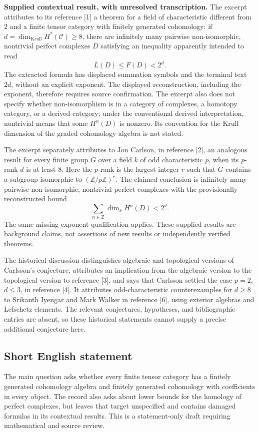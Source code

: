 \documentclass[11pt]{article}
\begin{document}
\textbf{Supplied contextual result, with unresolved transcription.} The excerpt attributes to its reference [1] a theorem for a field of characteristic different from \(2\) and a finite tensor category with finitely generated cohomology: if \(d=\dim_{\mathrm{Krull}}H^*(\mathcal C)\geq 8\), there are infinitely many pairwise non-isomorphic, nontrivial perfect complexes \(D\) satisfying an inequality apparently intended to read
\[
 L(D)\leq F(D)<2^{d}.
\]
The extracted formula has displaced summation symbols and the terminal text \(2d\), without an explicit exponent. The displayed reconstruction, including the exponent, therefore requires source confirmation. The excerpt also does not specify whether non-isomorphism is in a category of complexes, a homotopy category, or a derived category; under the conventional derived interpretation, nontrivial means that some \(H^n(D)\) is nonzero. Its convention for the Krull dimension of the graded cohomology algebra is not stated.

The excerpt separately attributes to Jon Carlson, in reference [2], an analogous result for every finite group \(G\) over a field \(k\) of odd characteristic \(p\), when its \(p\)-rank \(d\) is at least \(8\). Here the \(p\)-rank is the largest integer \(r\) such that \(G\) contains a subgroup isomorphic to \((\mathbb Z/p\mathbb Z)^r\). The claimed conclusion is infinitely many pairwise non-isomorphic, nontrivial perfect complexes with the provisionally reconstructed bound
\[
 \sum_{n\in\mathbb Z}\dim_k H^n(D)<2^{d}.
\]
The same missing-exponent qualification applies. These supplied results are background claims, not assertions of new results or independently verified theorems.

The historical discussion distinguishes algebraic and topological versions of Carlsson's conjecture, attributes an implication from the algebraic version to the topological version to reference [3], and says that Carlsson settled the case \(p=2\), \(d\leq 3\), in reference [4]. It attributes odd-characteristic counterexamples for \(d\geq 8\) to Srikanth Iyengar and Mark Walker in reference [6], using exterior algebras and Lefschetz elements. The relevant conjectures, hypotheses, and bibliographic entries are absent, so these historical statements cannot supply a precise additional conjecture here.
\subsection{Short English statement}
The main question asks whether every finite tensor category has a finitely generated cohomology algebra and finitely generated cohomology with coefficients in every object. The record also asks about lower bounds for the homology of perfect complexes, but leaves that target unspecified and contains damaged formulas in its contextual results. This is a statement-only draft requiring mathematical and source review.
\end{document}
